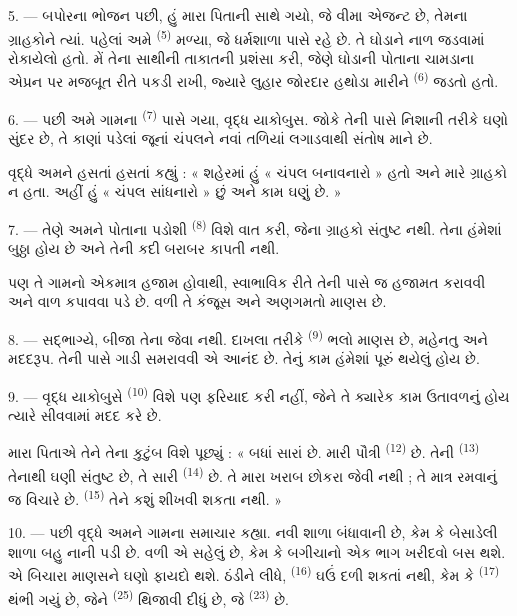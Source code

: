 \VUsaut{3.0mm}

5. --- બપોરના ભોજન પછી, હું મારા પિતાની સાથે ગયો, જે વીમા એજન્ટ છે,
તેમના ગ્રાહકોને ત્યાં. પહેલાં અમે  \textsuperscript{(5)}
મળ્યા, જે ધર્મશાળા પાસે રહે છે. તે ઘોડાને નાળ જડવામાં રોકાયેલો હતો.
મેં તેના સાથીની તાકાતની પ્રશંસા કરી, જેણે ઘોડાની  પોતાના
ચામડાના એપ્રન પર મજબૂત રીતે પકડી રાખી, જ્યારે લુહાર જોરદાર હથોડા મારીને
 \textsuperscript{(6)} જડતો હતો.

6. --- પછી અમે ગામના  \textsuperscript{(7)} પાસે ગયા,
વૃદ્ધ યાકોબુસ. જોકે તેની પાસે નિશાની તરીકે ઘણો સુંદર  છે,
તે કાણાં પડેલાં જૂનાં ચંપલને નવાં તળિયાં લગાડવાથી સંતોષ માને છે.

વૃદ્ધે અમને હસતાં હસતાં કહ્યું : « શહેરમાં હું « ચંપલ બનાવનારો » હતો
અને મારે ગ્રાહકો ન હતા. અહીં હું « ચંપલ સાંધનારો » છું અને કામ ઘણું છે. »

7. --- તેણે અમને પોતાના પડોશી  \textsuperscript{(8)} વિશે
વાત કરી, જેના ગ્રાહકો સંતુષ્ટ નથી. તેના  હંમેશાં બુઠ્ઠા
હોય છે અને તેની  કદી બરાબર કાપતી નથી.

પણ તે ગામનો એકમાત્ર હજામ હોવાથી, સ્વાભાવિક રીતે તેની પાસે જ હજામત
કરાવવી અને વાળ કપાવવા પડે છે. વળી તે કંજૂસ અને અણગમતો માણસ છે.

8. --- સદ્ભાગ્યે, બીજા  તેના જેવા નથી. દાખલા તરીકે
 \textsuperscript{(9)} ભલો માણસ છે, મહેનતુ અને
મદદરૂપ. તેની પાસે ગાડી સમરાવવી એ આનંદ છે. તેનું કામ હંમેશાં પૂરું
થયેલું હોય છે.

9. --- વૃદ્ધ યાકોબુસે  \textsuperscript{(10)}
વિશે પણ ફરિયાદ કરી નહીં, જેને તે ક્યારેક કામ ઉતાવળનું હોય ત્યારે
 સીવવામાં મદદ કરે છે.

મારા પિતાએ તેને તેના કુટુંબ વિશે પૂછ્યું : « બધાં સારાં છે. મારી
પૌત્રી  \textsuperscript{(12)} છે. તેની
 \textsuperscript{(13)} તેનાથી ઘણી સંતુષ્ટ છે, તે સારી
 \textsuperscript{(14)} છે. તે મારા ખરાબ છોકરા
જેવી નથી ; તે માત્ર રમવાનું જ વિચારે છે. 
\textsuperscript{(15)} તેને કશું શીખવી શકતા નથી. »

\VUsaut{3.0mm}
\VUsaut{3.0mm}

10. --- પછી વૃદ્ધે અમને ગામના સમાચાર કહ્યા. નવી શાળા બંધાવાની છે, કેમ
કે  બેસાડેલી શાળા બહુ નાની પડી છે. વળી એ સહેલું
છે, કેમ કે  બગીચાનો એક ભાગ ખરીદવો બસ થશે. એ બિચારા
માણસને ઘણો ફાયદો થશે. ઠંડીને લીધે,  \textsuperscript{(16)}
 ઘઉં દળી શકતાં નથી, કેમ કે 
\textsuperscript{(17)} થંભી ગયું છે, જેને 
\textsuperscript{(25)} થિજાવી દીધું છે, જે 
\textsuperscript{(23)} છે.


